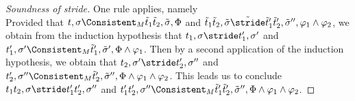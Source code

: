 \begin{proof}[Soundness of stride]
{One rule applies, namely \\
Provided that $t,\sigma\Consistent_M\tilde{t}_1\And \tilde{t}_2,\tilde{\sigma},\Phi$
and $\tilde{t}_1\And \tilde{t}_2,\tilde{\sigma}\tilde{\stride}\tilde{t}'_1\And\tilde{t}'_2,\tilde{\sigma}'',\phi_1\land\phi_2$,
we obtain from the induction hypothesis that $t_1,\sigma\stride t_1',\sigma'$ and $t_1',\sigma'\Consistent_M\tilde{t}_1',\tilde{\sigma}',\Phi\land\phi_1$.
Then by a second application of the induction hypothesis, we obtain that $t_2,\sigma'\stride t_2',\sigma''$ and $t_2',\sigma''\Consistent_M\tilde{t}_2',\tilde{\sigma}'',\Phi\land\phi_1\land\phi_2$.
This leads us to conclude $t_1\And t_2,\sigma\stride t_1'\And t_2',\sigma''$ and $t_1'\And t_2',\sigma''\Consistent_M\tilde{t}_1'\And\tilde{t}_2',\tilde{\sigma}'',\Phi\land\phi_1\land\phi_2$.

}

\end{proof}

